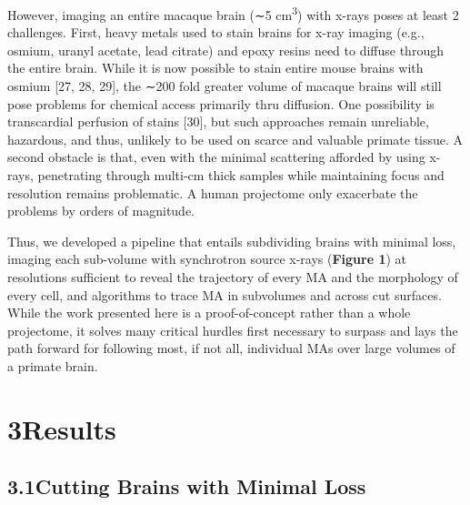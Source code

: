 \documentclass{article}
\begin{document}
However, imaging an entire macaque brain (∼5 cm\textsuperscript{3}) with x-rays poses at least 2 challenges. First, heavy metals used to stain brains for x-ray imaging (e.g., osmium, uranyl acetate, lead citrate) and epoxy resins need to diffuse through the entire brain. While it is now possible to stain entire mouse brains with osmium [27, 28, 29], the ∼200 fold greater volume of macaque brains will still pose problems for chemical access primarily thru diffusion. One possibility is transcardial perfusion of stains [30], but such approaches remain unreliable, hazardous, and thus, unlikely to be used on scarce and valuable primate tissue. A second obstacle is that, even with the minimal scattering afforded by using x-rays, penetrating through multi-cm thick samples while maintaining focus and resolution remains problematic. A human projectome only exacerbate the problems by orders of magnitude.

Thus, we developed a pipeline that entails subdividing brains with minimal loss, imaging each sub-volume with synchrotron source x-rays (\textbf{Figure 1}) at resolutions sufficient to reveal the trajectory of every MA and the morphology of every cell, and algorithms to trace MA in subvolumes and across cut surfaces. While the work presented here is a proof-of-concept rather than a whole projectome, it solves many critical hurdles first necessary to surpass and lays the path forward for following most, if not all, individual MAs over large volumes of a primate brain.

\section*{3\quad Results}

\subsection*{3.1\quad Cutting Brains with Minimal Loss}
\end{document}
